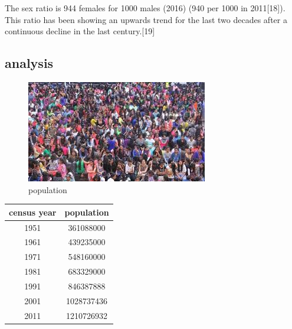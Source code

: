 \documentclass[12pt]{article}
\begin{document}
The sex ratio is 944 females for 1000 males (2016) (940 per 1000 in 2011[18]). This ratio has been showing an upwards trend for the last two decades after a continuous decline in the last century.[19]
\subsection{analysis}
\begin{figure}
    \centering
    \includegraphics[width=1.2\linewidth]{population}
    \caption{population}
    
\end{figure}

\begin{tabular}{|c|c|}
    \hline
    census year & population \\ \hline
    1951 & 361088000 \\ \hline
    1961 & 439235000 \\ \hline
    1971 & 548160000 \\ \hline
    1981 & 683329000 \\ \hline
    1991 & 846387888 \\ \hline
    2001 & 1028737436 \\ \hline
    2011 & 1210726932 \\ \hline
\end{tabular}
\end{document}
